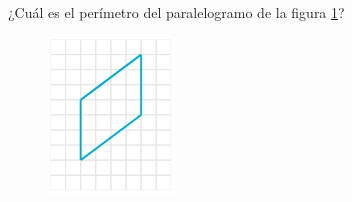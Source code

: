 
¿Cuál es el perímetro del paralelogramo de la figura \ref{fig:peri_paralelogramo_01}?
\begin{figure}[H]
    \begin{center}
        \includegraphics[width=0.3\textwidth]{../images/peri_paralelogramo_01.png}
    \end{center}
    \caption{}
    \label{fig:peri_paralelogramo_01}
\end{figure}